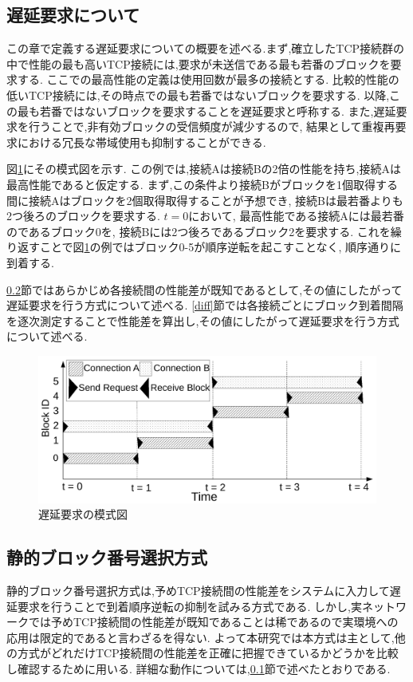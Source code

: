 \documentclass[a4j,12pt]{gradthesis_utf8}
\begin{document}
\newpage

\subsection{遅延要求について}
\label{chienyokyu}
この章で定義する遅延要求についての概要を述べる.まず,確立したTCP接続群の中で性能の最も高いTCP接続には,要求が未送信である最も若番のブロックを要求する.
ここでの最高性能の定義は使用回数が最多の接続とする.
比較的性能の低いTCP接続には,その時点での最も若番ではないブロックを要求する.
以降,この最も若番ではないブロックを要求することを遅延要求と呼称する.
また,遅延要求を行うことで,非有効ブロックの受信頻度が減少するので,
結果として重複再要求における冗長な帯域使用も抑制することができる.

図\ref{delay}にその模式図を示す.
この例では,接続Aは接続Bの2倍の性能を持ち,接続Aは最高性能であると仮定する.
まず,この条件より接続Bがブロックを1個取得する間に接続Aはブロックを2個取得取得することが予想でき,
接続Bは最若番よりも2つ後ろのブロックを要求する.
\begin{math}t=0\end{math}において,
最高性能である接続Aには最若番のであるブロック0を,
接続Bには2つ後ろであるブロック2を要求する.
これを繰り返すことで図\ref{delay}の例ではブロック0-5が順序逆転を起こすことなく,
順序通りに到着する.

\ref{kotei}節ではあらかじめ各接続間の性能差が既知であるとして,その値にしたがって遅延要求を行う方式について述べる.
\ref{diff}節では各接続ごとにブロック到着間隔を逐次測定することで性能差を算出し,その値にしたがって遅延要求を行う方式について述べる.

\begin{figure}[ht]
    \centering
    \includegraphics[width=16.25cm]{figure/delay-n.pdf}
    \caption{遅延要求の模式図}
    \label{delay}
\end{figure}

\subsection{静的ブロック番号選択方式}
\label{kotei}
静的ブロック番号選択方式は,予めTCP接続間の性能差をシステムに入力して遅延要求を行うことで到着順序逆転の抑制を試みる方式である.
しかし,実ネットワークでは予めTCP接続間の性能差が既知であることは稀であるので実環境への応用は限定的であると言わざるを得ない.
よって本研究では本方式は主として,他の方式がどれだけTCP接続間の性能差を正確に把握できているかどうかを比較し確認するために用いる.
詳細な動作については,\ref{chienyokyu}節で述べたとおりである.
\end{document}
